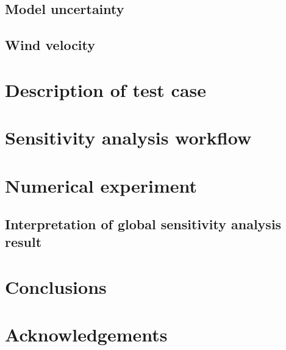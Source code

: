 \documentclass[review]{elsarticle}
\numberwithin{equation}{section}
\newcommand{\myreferences}{./Bibliography/references}
\numberwithin{equation}{section}
\begin{document}
\subsection{Model uncertainty}
\subsection{Wind velocity}
\section{Description of test case}
\section{Sensitivity analysis workflow}
\section{Numerical experiment}
\subsection{Interpretation of global sensitivity analysis result}
\section{Conclusions}
\section*{Acknowledgements}

\end{document}
